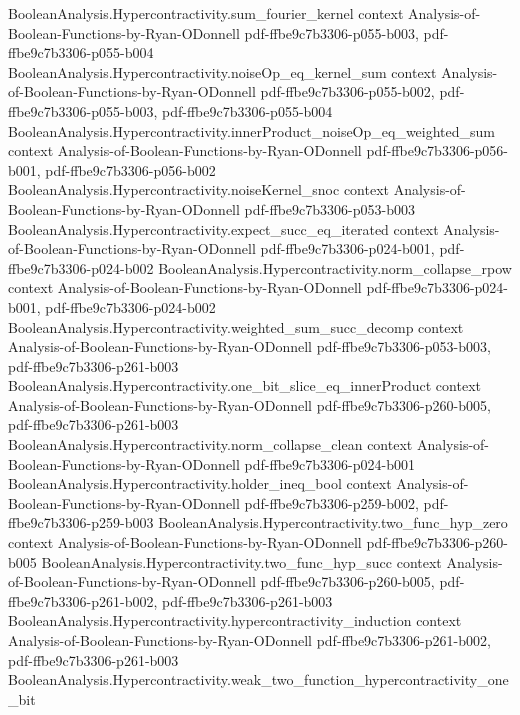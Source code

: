 \begin{lemma}
\proofstep
  {BooleanAnalysis.Hypercontractivity.sum_fourier_kernel}
  {context}
  {Analysis-of-Boolean-Functions-by-Ryan-ODonnell}
  {pdf-ffbe9c7b3306-p055-b003,
    pdf-ffbe9c7b3306-p055-b004}
\proofstep
  {BooleanAnalysis.Hypercontractivity.noiseOp_eq_kernel_sum}
  {context}
  {Analysis-of-Boolean-Functions-by-Ryan-ODonnell}
  {pdf-ffbe9c7b3306-p055-b002,
    pdf-ffbe9c7b3306-p055-b003,
    pdf-ffbe9c7b3306-p055-b004}
\proofstep
  {BooleanAnalysis.Hypercontractivity.innerProduct_noiseOp_eq_weighted_sum}
  {context}
  {Analysis-of-Boolean-Functions-by-Ryan-ODonnell}
  {pdf-ffbe9c7b3306-p056-b001,
    pdf-ffbe9c7b3306-p056-b002}
\proofstep
  {BooleanAnalysis.Hypercontractivity.noiseKernel_snoc}
  {context}
  {Analysis-of-Boolean-Functions-by-Ryan-ODonnell}
  {pdf-ffbe9c7b3306-p053-b003}
\proofstep
  {BooleanAnalysis.Hypercontractivity.expect_succ_eq_iterated}
  {context}
  {Analysis-of-Boolean-Functions-by-Ryan-ODonnell}
  {pdf-ffbe9c7b3306-p024-b001,
    pdf-ffbe9c7b3306-p024-b002}
\proofstep
  {BooleanAnalysis.Hypercontractivity.norm_collapse_rpow}
  {context}
  {Analysis-of-Boolean-Functions-by-Ryan-ODonnell}
  {pdf-ffbe9c7b3306-p024-b001,
    pdf-ffbe9c7b3306-p024-b002}
\proofstep
  {BooleanAnalysis.Hypercontractivity.weighted_sum_succ_decomp}
  {context}
  {Analysis-of-Boolean-Functions-by-Ryan-ODonnell}
  {pdf-ffbe9c7b3306-p053-b003,
    pdf-ffbe9c7b3306-p261-b003}
\proofstep
  {BooleanAnalysis.Hypercontractivity.one_bit_slice_eq_innerProduct}
  {context}
  {Analysis-of-Boolean-Functions-by-Ryan-ODonnell}
  {pdf-ffbe9c7b3306-p260-b005,
    pdf-ffbe9c7b3306-p261-b003}
\proofstep
  {BooleanAnalysis.Hypercontractivity.norm_collapse_clean}
  {context}
  {Analysis-of-Boolean-Functions-by-Ryan-ODonnell}
  {pdf-ffbe9c7b3306-p024-b001}
\proofstep
  {BooleanAnalysis.Hypercontractivity.holder_ineq_bool}
  {context}
  {Analysis-of-Boolean-Functions-by-Ryan-ODonnell}
  {pdf-ffbe9c7b3306-p259-b002,
    pdf-ffbe9c7b3306-p259-b003}
\proofstep
  {BooleanAnalysis.Hypercontractivity.two_func_hyp_zero}
  {context}
  {Analysis-of-Boolean-Functions-by-Ryan-ODonnell}
  {pdf-ffbe9c7b3306-p260-b005}
\proofstep
  {BooleanAnalysis.Hypercontractivity.two_func_hyp_succ}
  {context}
  {Analysis-of-Boolean-Functions-by-Ryan-ODonnell}
  {pdf-ffbe9c7b3306-p260-b005,
    pdf-ffbe9c7b3306-p261-b002,
    pdf-ffbe9c7b3306-p261-b003}
\proofstep
  {BooleanAnalysis.Hypercontractivity.hypercontractivity_induction}
  {context}
  {Analysis-of-Boolean-Functions-by-Ryan-ODonnell}
  {pdf-ffbe9c7b3306-p261-b002,
    pdf-ffbe9c7b3306-p261-b003}
\proofstep
  {BooleanAnalysis.Hypercontractivity.weak_two_function_hypercontractivity_one_bit}

\end{lemma}
